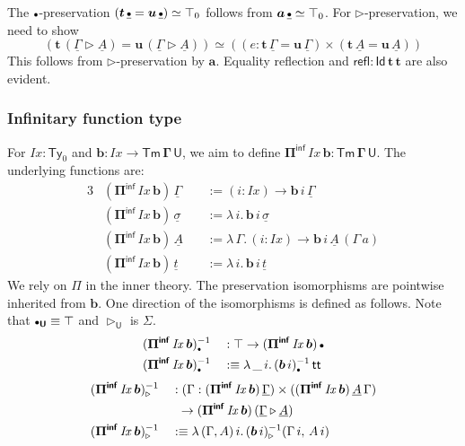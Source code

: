 \documentclass[12pt,a4paper,twoside,openany]{book}
\theoremstyle{remark}
\theoremstyle{definition}
\theoremstyle{theorem}
\newcommand{\mi}[1]{\mathit{#1}}
\newcommand{\bs}[1]{\boldsymbol{#1}}
\newcommand{\refl}{\mathsf{refl}}
\newcommand{\Tm}{\mathsf{Tm}}
\newcommand{\Ty}{\mathsf{Ty}}
\newcommand{\U}{\mathsf{U}}
\newcommand{\Id}{\mathsf{Id}}
\renewcommand{\tt}{\mathsf{tt}}
\newcommand{\ra}{\rightarrow}
\newcommand{\ext}{\triangleright}
\newcommand{\emptycon}{\scaleobj{.75}\bullet}
\newcommand{\Piinf}{\Pi^{\mathsf{inf}}}
\newcommand{\bTm}{\bs{\Tm}}
\newcommand{\bGamma}{\bs{\Gamma}}
\newcommand{\bt}{\bs{t}}
\newcommand{\bu}{\bs{u}}
\newcommand{\ba}{\bs{a}}
\newcommand{\bb}{\bs{b}}
\newcommand{\bU}{\bs{\U}}
\newcommand{\bPiinf}{\bs{\Piinf}}
\newcommand{\bId}{\bs{\Id}}
\newcommand{\ul}[1]{\underline{#1}}
\newcommand{\ulGamma}{\ul{\Gamma}}
\newcommand{\ulsigma}{\ul{\sigma}}
\newcommand{\ulemptycon}{\ul{\emptycon}}
\newcommand{\ult}{\ul{t}}
\newcommand{\ulA}{\ul{A}}
\newcommand{\defn}{:\equiv}
\begin{document}
The $\emptycon$-preservation $(\bt\,\ulemptycon = \bu\,\ulemptycon) \simeq
\top_0$ follows from $\ba\,\ulemptycon \simeq \top_0$. For $\ext$-preservation,
we need to show
\[
 (\bt\,(\ulGamma \ext \ulA) = \bu\,(\ulGamma \ext \ulA)) \simeq
 ((e : \bt\,\ulGamma = \bu\,\ulGamma) \times (\bt\,\ulA = \bu\,\ulA))
\]
This follows from $\ext$-preservation by $\ba$. Equality reflection and
$\bs{\refl :} \bId\,\bt\,\bt$ are also evident.

\subsubsection{Infinitary function type}

For $\mi{Ix} : \Ty_0$ and $\bb : \mi{Ix} \ra \bTm\,\bGamma\,\bU$, we aim to define
$\bPiinf\,\mi{Ix}\,\bb \bs{:} \bTm\,\bGamma\,\bU$. The underlying functions
are:
\begin{alignat*}{3}
  & (\bPiinf\,\mi{Ix}\,\bb)\,\ulGamma    &&:= (i : \mi{Ix})\ra \bb\,i\,\ulGamma\\
  & (\bPiinf\,\mi{Ix}\,\bb)\,\ulsigma    &&:= \lambda\,i.\, \bb\,i\,\ulsigma\\
  & (\bPiinf\,\mi{Ix}\,\bb)\,\ulA\       &&:= \lambda\,\Gamma.\,(i : \mi{Ix})\ra \bb\,i\,\ulA\,(\Gamma\, a)\\
  & (\bPiinf\,\mi{Ix}\,\bb)\,\ult        &&:= \lambda\,i.\, \bb\,i\,\ult
\end{alignat*}
We rely on $\Pi$ in the inner theory. The preservation isomorphisms are
pointwise inherited from $\bb$. One direction of the isomorphisms is defined as
follows. Note that $\emptycon_{\bU} \equiv \top$ and $\ext_{\bU}$ is $\Sigma$.
\begin{alignat*}{3}
  &(\bPiinf\,\mi{Ix}\,\bb)_{\emptycon}^{-1} && : \top\ra (\bPiinf\,\mi{Ix}\,\bb)\,\emptycon\\
  &(\bPiinf\,\mi{Ix}\,\bb)_{\emptycon}^{-1} && \defn \lambda\,\_\,i.\,(\bb\,i)_{\emptycon}^{-1}\,\tt
\end{alignat*}
\begin{alignat*}{3}
  &(\bPiinf\,\mi{Ix}\,\bb)_{\ext}^{-1} && : (\Gamma : (\bPiinf\,\mi{Ix}\,\bb)\,\ulGamma)\times((\bPiinf\,\mi{Ix}\,\bb)\,\ulA\,\Gamma)\\
  & && \hspace{0.5em}\ra (\bPiinf\,\mi{Ix}\,\bb)\,(\ulGamma \ext \ulA)\\
  & (\bPiinf\,\mi{Ix}\,\bb)_{\ext}^{-1} && \defn \lambda\,(\Gamma,A)\,i.\,(\bb\,i)_{\ext}^{-1}(\Gamma\,i,\,A\,i)
\end{alignat*}
\end{document}

